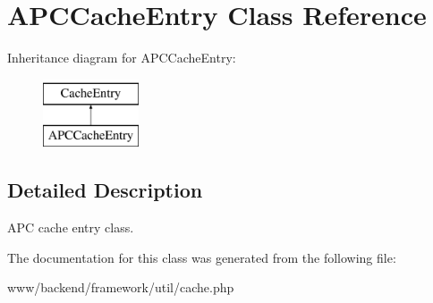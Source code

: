 \hypertarget{classAPCCacheEntry}{
\section{APCCacheEntry Class Reference}
\label{classAPCCacheEntry}
}
Inheritance diagram for APCCacheEntry:\begin{figure}[H]
\begin{center}
\leavevmode
\includegraphics[height=2.000000cm]{classAPCCacheEntry}
\end{center}
\end{figure}


\subsection{Detailed Description}
APC cache entry class. 

The documentation for this class was generated from the following file:\begin{DoxyCompactItemize}
\item 
www/backend/framework/util/cache.php\end{DoxyCompactItemize}
